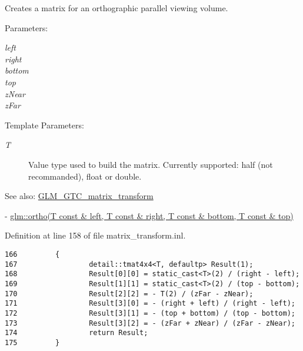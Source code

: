 Creates a matrix for an orthographic parallel viewing volume.

\begin{Desc}
\item[Parameters:]
\begin{description}
\item[{\em left}]\item[{\em right}]\item[{\em bottom}]\item[{\em top}]\item[{\em zNear}]\item[{\em zFar}]\end{description}
\end{Desc}
\begin{Desc}
\item[Template Parameters:]
\begin{description}
\item[{\em T}]Value type used to build the matrix. Currently supported: half (not recommanded), float or double. \end{description}
\end{Desc}
\begin{Desc}
\item[See also:]\hyperlink{group__gtc__matrix__transform}{GLM\_\-GTC\_\-matrix\_\-transform} 

- \hyperlink{group__gtc__matrix__transform_gdab1dbf2b9ceda856624bafa09b3de07}{glm::ortho(T const \& left, T const \& right, T const \& bottom, T const \& top)} \end{Desc}


Definition at line 158 of file matrix\_\-transform.inl.

\begin{Code}\begin{verbatim}166         {
167                 detail::tmat4x4<T, defaultp> Result(1);
168                 Result[0][0] = static_cast<T>(2) / (right - left);
169                 Result[1][1] = static_cast<T>(2) / (top - bottom);
170                 Result[2][2] = - T(2) / (zFar - zNear);
171                 Result[3][0] = - (right + left) / (right - left);
172                 Result[3][1] = - (top + bottom) / (top - bottom);
173                 Result[3][2] = - (zFar + zNear) / (zFar - zNear);
174                 return Result;
175         }
\end{verbatim}
\end{Code}


